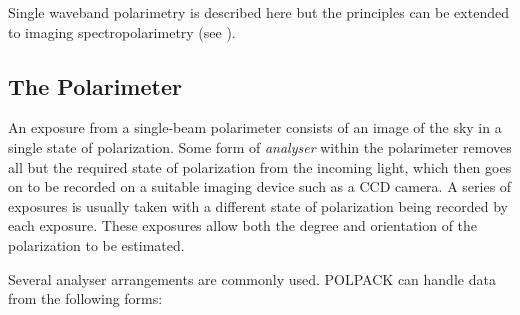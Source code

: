 \documentclass[twoside,11pt]{starlink}
\begin{document}
Single waveband polarimetry is described here but the principles can be
extended to imaging spectropolarimetry (see ).

\subsection{\label{SEC:SBPOLARIM}The Polarimeter}
An exposure from a single-beam polarimeter consists of an image of the sky
in a single state of polarization. Some form of \emph{analyser} within
the polarimeter removes all but the required state of polarization from
the incoming light, which then goes on to be recorded on a suitable
imaging device such as a CCD camera. A series of exposures is usually taken
with a different state of polarization being recorded by each exposure.
These exposures allow both the degree and orientation of the polarization
to be estimated.

Several analyser arrangements are commonly used. POLPACK can handle data
from the following forms:
\end{document}
